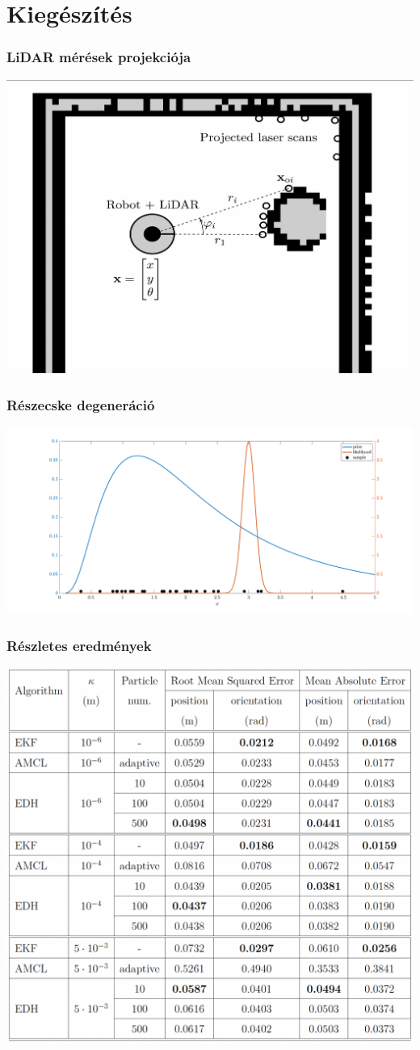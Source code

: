 \documentclass{beamer}
\begin{document}
\section{Kiegészítés}
\begin{frame}
    \frametitle{LiDAR mérések projekciója}
    \begin{center}
        \includegraphics[width=0.8\linewidth]{_Figures/dt_mapping_lidar.png}
    \end{center}
\end{frame}
\begin{frame}
    \frametitle{Részecske degeneráció}
    \begin{center}
        \includegraphics[width=1\linewidth]{_Figures/pf_degen.pdf}
    \end{center}
\end{frame}
\begin{frame}
    \frametitle{Részletes eredmények}
    \begin{center}
        \includegraphics[width=0.7\linewidth]{_Figures/results_table.png}
    \end{center}
\end{frame}
\end{document}
